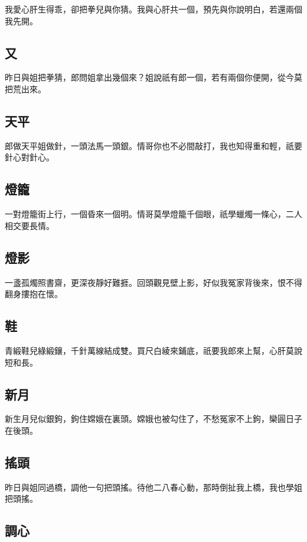 我愛心肝生得乖，卻把拳兒與你猜。我與心肝共一個，預先與你說明白，若還兩個我先開。

\subsection*{又}

昨日與姐把拳猜，郎問姐拿出幾個來？姐說祇有郎一個，若有兩個你便開，從今莫把荒出來。

\subsection*{天平}

郎做天平姐做針，一頭法馬一頭銀。情哥你也不必間敲打，我也知得重和輕，祇要針心對針心。

\subsection*{燈籠}

一對燈籠街上行，一個昏來一個明。情哥莫學燈籠千個眼，祇學蠟燭一條心，二人相交要長情。

\subsection*{燈影}

一盞孤燭照書齋，更深夜靜好難捱。回頭觀見壁上影，好似我冤家背後來，恨不得翻身摟抱在懷。

\subsection*{鞋}

青緞鞋兒綠緞鑲，千針萬線結成雙。買尺白綾來鋪底，祇要我郎來上幫，心肝莫說短和長。

\subsection*{新月}

新生月兒似銀鉤，鉤住嫦娥在裏頭。嫦娥也被勾住了，不愁冤家不上鉤，欒圓日子在後頭。

\subsection*{搖頭}

昨日與姐同過橋，調他一句把頭搖。待他二八春心動，那時倒扯我上橋，我也學姐把頭搖。

\subsection*{調心}

